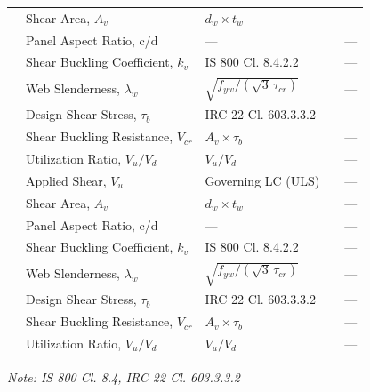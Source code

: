 \documentclass[12pt,a4paper]{report}
\numberwithin{table}{chapter}
\numberwithin{figure}{chapter}
\begin{document}
\begin{longtable}{|C{2.5cm}|C{3.5cm}|C{3.5cm}|>{\centering\arraybackslash}p{4.2cm}|C{1.8cm}|}
 & Shear Area, $A_v$ & $d_w \times t_w$ &  & --- \\[6pt]
 & Panel Aspect Ratio, c/d & --- &  & --- \\[6pt]
 & Shear Buckling Coefficient, $k_v$ & IS 800 Cl. 8.4.2.2 &  & --- \\[6pt]
 & Web Slenderness, $\lambda_w$ & $\sqrt{f_{yw}/(\sqrt{3}\,\tau_{cr})}$ &  & --- \\[6pt]
 & Design Shear Stress, $\tau_b$ & IRC 22 Cl. 603.3.3.2 &  & --- \\[6pt]
 & Shear Buckling Resistance, $V_{cr}$ & $A_v \times \tau_b$ &  & --- \\[6pt]
 & Utilization Ratio, $V_u / V_d$ & $V_u / V_d$ &  & --- \\[6pt]
\hline
{} & Applied Shear, $V_u$ & Governing LC (ULS) &  & --- \\[6pt]
 & Shear Area, $A_v$ & $d_w \times t_w$ &  & --- \\[6pt]
 & Panel Aspect Ratio, c/d & --- &  & --- \\[6pt]
 & Shear Buckling Coefficient, $k_v$ & IS 800 Cl. 8.4.2.2 &  & --- \\[6pt]
 & Web Slenderness, $\lambda_w$ & $\sqrt{f_{yw}/(\sqrt{3}\,\tau_{cr})}$ &  & --- \\[6pt]
 & Design Shear Stress, $\tau_b$ & IRC 22 Cl. 603.3.3.2 &  & --- \\[6pt]
 & Shear Buckling Resistance, $V_{cr}$ & $A_v \times \tau_b$ &  & --- \\[6pt]
 & Utilization Ratio, $V_u / V_d$ & $V_u / V_d$ &  & --- \\[6pt]
\hline
\end{longtable}
\noindent\textit{Note: IS 800 Cl. 8.4, IRC 22 Cl. 603.3.3.2}
\end{document}
